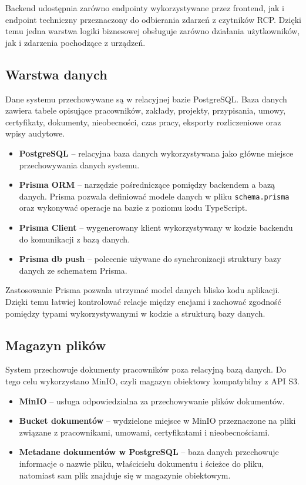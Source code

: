 Backend udostępnia zarówno endpointy wykorzystywane przez frontend, jak i endpoint techniczny przeznaczony do odbierania zdarzeń z czytników RCP. Dzięki temu jedna warstwa logiki biznesowej obsługuje zarówno działania użytkowników, jak i zdarzenia pochodzące z urządzeń.

\subsection{Warstwa danych}

Dane systemu przechowywane są w relacyjnej bazie PostgreSQL. Baza danych zawiera tabele opisujące pracowników, zakłady, projekty, przypisania, umowy, certyfikaty, dokumenty, nieobecności, czas pracy, eksporty rozliczeniowe oraz wpisy audytowe.

\begin{itemize}
    \item \textbf{PostgreSQL} -- relacyjna baza danych wykorzystywana jako główne miejsce przechowywania danych systemu.
    \item \textbf{Prisma ORM} -- narzędzie pośredniczące pomiędzy backendem a bazą danych. Prisma pozwala definiować modele danych w pliku \texttt{schema.prisma} oraz wykonywać operacje na bazie z poziomu kodu TypeScript.
    \item \textbf{Prisma Client} -- wygenerowany klient wykorzystywany w kodzie backendu do komunikacji z bazą danych.
    \item \textbf{Prisma db push} -- polecenie używane do synchronizacji struktury bazy danych ze schematem Prisma.
\end{itemize}

Zastosowanie Prisma pozwala utrzymać model danych blisko kodu aplikacji. Dzięki temu łatwiej kontrolować relacje między encjami i zachować zgodność pomiędzy typami wykorzystywanymi w kodzie a strukturą bazy danych.

\subsection{Magazyn plików}

System przechowuje dokumenty pracowników poza relacyjną bazą danych. Do tego celu wykorzystano MinIO, czyli magazyn obiektowy kompatybilny z API S3.

\begin{itemize}
    \item \textbf{MinIO} -- usługa odpowiedzialna za przechowywanie plików dokumentów.
    \item \textbf{Bucket dokumentów} -- wydzielone miejsce w MinIO przeznaczone na pliki związane z pracownikami, umowami, certyfikatami i nieobecnościami.
    \item \textbf{Metadane dokumentów w PostgreSQL} -- baza danych przechowuje informacje o nazwie pliku, właścicielu dokumentu i ścieżce do pliku, natomiast sam plik znajduje się w magazynie obiektowym.
\end{itemize}

